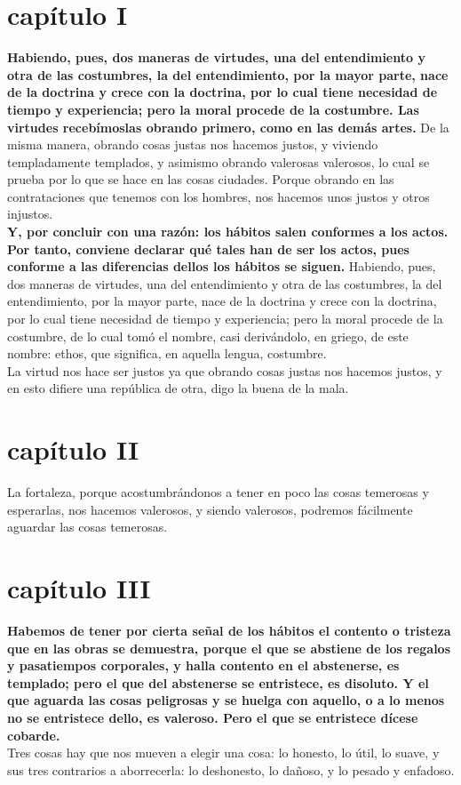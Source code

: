 \begin{multicols}{2}

\section*{capítulo I}
\textbf{Habiendo, pues, dos maneras de virtudes, una del entendimiento y otra de las costumbres, la del entendimiento, por la mayor parte, nace de la doctrina y crece con la doctrina, por lo cual tiene necesidad de tiempo y experiencia; pero la moral procede de la costumbre. Las virtudes recebímoslas obrando primero, como en las demás artes.} De la misma manera, obrando cosas justas nos hacemos justos, y viviendo templadamente templados, y asimismo obrando valerosas valerosos, lo cual se prueba por lo que se hace en las cosas ciudades. Porque obrando en las contrataciones que tenemos con los hombres, nos hacemos unos justos y otros injustos.\\
\textbf{Y, por concluir con una razón: los hábitos salen conformes a los actos. Por tanto, conviene declarar qué tales han de ser los actos, pues conforme a las diferencias dellos los hábitos se siguen.}
Habiendo, pues, dos maneras de virtudes, una del entendimiento y otra de las costumbres, la del entendimiento, por la mayor parte, nace de la doctrina y crece con la doctrina, por lo cual tiene necesidad de tiempo y experiencia; pero la moral procede de la costumbre, de lo cual tomó el nombre, casi derivándolo, en griego, de este nombre: ethos, que significa, en aquella lengua, costumbre.\\
La virtud nos hace ser justos ya que obrando cosas justas nos hacemos justos, y en esto difiere una república de otra, digo la buena de la mala.

\section*{capítulo II}
La fortaleza, porque acostumbrándonos a tener en poco las cosas temerosas y esperarlas, nos hacemos valerosos, y siendo valerosos, podremos fácilmente aguardar las cosas temerosas.

\section*{capítulo III}
\textbf{Habemos de tener por cierta señal de los hábitos el contento o tristeza que en las obras se demuestra, porque el que se abstiene de los regalos y pasatiempos corporales, y halla contento en el abstenerse, es templado; pero el que del abstenerse se entristece, es disoluto. Y el que aguarda las cosas peligrosas y se huelga con aquello, o a lo menos no se entristece dello, es valeroso. Pero el que se entristece dícese cobarde.}\\
Tres cosas hay que nos mueven a elegir una cosa: lo honesto, lo útil, lo suave, y sus tres contrarios a aborrecerla: lo deshonesto, lo dañoso, y lo pesado y enfadoso.


\end{multicols}
